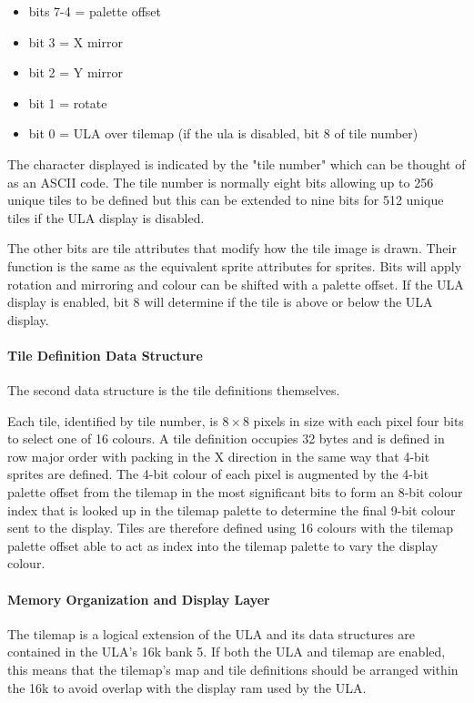 \begin{itemize}
\item bits 7-4 = palette offset
\item bit 3 = X mirror
\item bit 2 = Y mirror
\item bit 1 = rotate
\item bit 0 = ULA over tilemap (if the ula is disabled, bit 8 of tile number)
\end{itemize}

The character displayed is indicated by the "tile number" which can be
thought of as an ASCII code.  The tile number is normally eight bits
allowing up to 256 unique tiles to be defined but this can be extended
to nine bits for 512 unique tiles if the ULA display is disabled.

The other bits are tile attributes that modify how the tile image is
drawn.  Their function is the same as the equivalent sprite attributes
for sprites.  Bits will apply rotation and mirroring and colour can be
shifted with a palette offset.  If the ULA display is enabled, bit 8
will determine if the tile is above or below the ULA display.

\paragraph{Tile Definition Data Structure}

The second data structure is the tile definitions themselves.

Each tile, identified by tile number, is $8\times8$ pixels in size
with each pixel four bits to select one of 16 colours.  A tile
definition occupies 32 bytes and is defined in row major order with
packing in the X direction in the same way that 4-bit sprites are
defined.  The 4-bit colour of each pixel is augmented by the 4-bit
palette offset from the tilemap in the most significant bits to form
an 8-bit colour index that is looked up in the tilemap palette to
determine the final 9-bit colour sent to the display.  Tiles are
therefore defined using 16 colours with the tilemap palette offset
able to act as index into the tilemap palette to vary the display
colour.

\paragraph{Memory Organization and Display Layer}

The tilemap is a logical extension of the ULA and its data structures
are contained in the ULA's 16k bank 5.  If both the ULA and tilemap
are enabled, this means that the tilemap's map and tile definitions
should be arranged within the 16k to avoid overlap with the display
ram used by the ULA.

